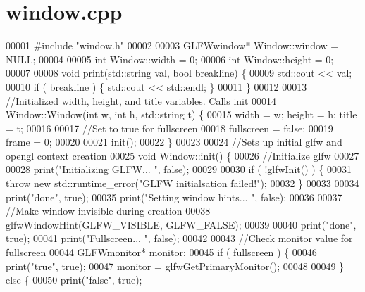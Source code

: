 \section{window.\+cpp}
\label{window_8cpp_source}

\begin{DoxyCode}
00001 \textcolor{preprocessor}{#include "window.h"}
00002 
00003 GLFWwindow* Window::window = NULL;
00004 
00005 \textcolor{keywordtype}{int} Window::width  = 0;
00006 \textcolor{keywordtype}{int} Window::height = 0;
00007 
00008 \textcolor{keywordtype}{void} print(std::string val, \textcolor{keywordtype}{bool} breakline) \{
00009     std::cout << val;
00010     \textcolor{keywordflow}{if} ( breakline ) \{ std::cout << std::endl; \}
00011 \}
00012 
00013 \textcolor{comment}{//Initialized width, height, and title variables. Calls init}
00014 Window::Window(\textcolor{keywordtype}{int} w, \textcolor{keywordtype}{int} h, std::string t) \{
00015     width = w; height = h; title = t;
00016 
00017     \textcolor{comment}{//Set to true for fullscreen}
00018     fullscreen = \textcolor{keyword}{false};
00019     frame      = 0;
00020 
00021     init();
00022 \}
00023 
00024 \textcolor{comment}{//Sets up initial glfw and opengl context creation}
00025 \textcolor{keywordtype}{void} Window::init() \{
00026     \textcolor{comment}{//Initialize glfw}
00027 
00028     print(\textcolor{stringliteral}{"Initializing GLFW... "}, \textcolor{keyword}{false});
00029 
00030     \textcolor{keywordflow}{if} ( !glfwInit() ) \{
00031         \textcolor{keywordflow}{throw} \textcolor{keyword}{new} std::runtime\_error(\textcolor{stringliteral}{"GLFW initialsation failed!"});
00032     \}
00033     
00034     print(\textcolor{stringliteral}{"done"}, \textcolor{keyword}{true});
00035     print(\textcolor{stringliteral}{"Setting window hints... "}, \textcolor{keyword}{false});
00036 
00037     \textcolor{comment}{//Make window invisible during creation}
00038     glfwWindowHint(GLFW\_VISIBLE, GLFW\_FALSE);
00039 
00040     print(\textcolor{stringliteral}{"done"}, \textcolor{keyword}{true});
00041     print(\textcolor{stringliteral}{"Fullscreen... "}, \textcolor{keyword}{false});
00042 
00043     \textcolor{comment}{//Check monitor value for fullscreen}
00044     GLFWmonitor* monitor;
00045     \textcolor{keywordflow}{if} ( fullscreen ) \{
00046         print(\textcolor{stringliteral}{"true"}, \textcolor{keyword}{true});
00047         monitor = glfwGetPrimaryMonitor();
00048 
00049     \} \textcolor{keywordflow}{else} \{ 
00050         print(\textcolor{stringliteral}{"false"}, \textcolor{keyword}{true}); 

\end{DoxyCode}
